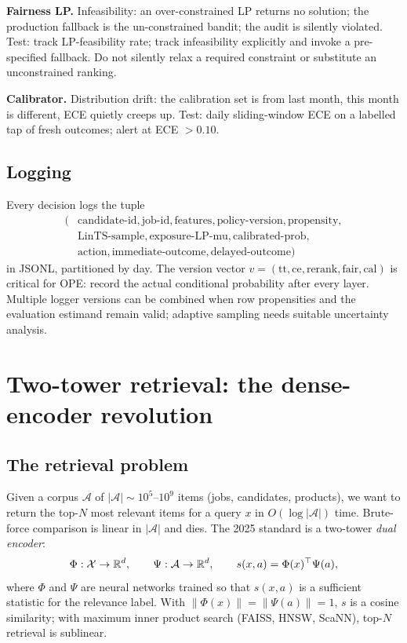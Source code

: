 \documentclass[11pt,oneside]{scrbook}
\begin{document}
\textbf{Fairness LP.} Infeasibility: an over-constrained LP returns no
solution; the production fallback is the un-constrained bandit; the audit
is silently violated. Test: track LP-feasibility rate; track infeasibility explicitly and invoke a pre-specified fallback.
Do not silently relax a required constraint or substitute an unconstrained ranking.

\textbf{Calibrator.} Distribution drift: the calibration set is from last
month, this month is different, ECE quietly creeps up. Test: daily
sliding-window ECE on a labelled tap of fresh outcomes; alert at
ECE $> 0.10$.

\section{Logging}

Every decision logs the tuple
\[
\begin{aligned}
(&\text{candidate-id}, \text{job-id}, \text{features},
 \text{policy-version}, \text{propensity},\\
 &\text{LinTS-sample}, \text{exposure-LP-mu}, \text{calibrated-prob},\\
 &\text{action}, \text{immediate-outcome}, \text{delayed-outcome})
\end{aligned}
\]
in JSONL, partitioned by day. The version vector $v = (\text{tt}, \text{ce},
\text{rerank}, \text{fair}, \text{cal})$ is critical for OPE: record the actual conditional probability after every layer. Multiple
logger versions can be combined when row propensities and the evaluation
estimand remain valid; adaptive sampling needs suitable uncertainty analysis.

\chapter{Two-tower retrieval: the dense-encoder revolution}

\section{The retrieval problem}

Given a corpus $\mathcal{A}$ of $|\mathcal{A}| \sim 10^5$--$10^9$ items (jobs,
candidates, products), we want to return the top-$N$ most relevant items
for a query $x$ in $O(\log |\mathcal{A}|)$ time. Brute-force comparison is
linear in $|\mathcal{A}|$ and dies. The 2025 standard is a two-tower
\emph{dual encoder}:
\[
\Phi: \mathcal{X} \to \mathbb{R}^d, \qquad \Psi: \mathcal{A} \to \mathbb{R}^d,
\qquad s(x, a) = \Phi(x)^\top \Psi(a),
\]
where $\Phi$ and $\Psi$ are neural networks trained so that
$s(x, a)$ is a sufficient statistic for the relevance label. With
$\|\Phi(x)\| = \|\Psi(a)\| = 1$, $s$ is a cosine similarity; with maximum
inner product search (FAISS, HNSW, ScaNN), top-$N$ retrieval is
sublinear.
\end{document}
